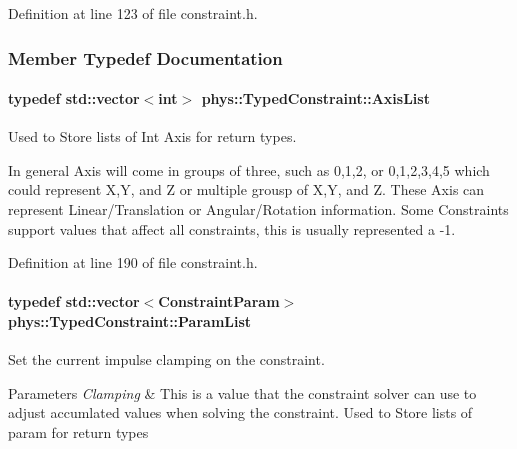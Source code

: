 Definition at line 123 of file constraint.h.



\subsubsection{Member Typedef Documentation}
\hypertarget{classphys_1_1TypedConstraint_a26261a4055e84e104c58d84eea5667c2}{
\paragraph[{AxisList}]{\setlength{\rightskip}{0pt plus 5cm}typedef std::vector$<$int$>$ {\bf phys::TypedConstraint::AxisList}}\hfill}
\label{classphys_1_1TypedConstraint_a26261a4055e84e104c58d84eea5667c2}


Used to Store lists of Int Axis for return types. 

In general Axis will come in groups of three, such as 0,1,2, or 0,1,2,3,4,5 which could represent X,Y, and Z or multiple grousp of X,Y, and Z. These Axis can represent Linear/Translation or Angular/Rotation information. Some Constraints support values that affect all constraints, this is usually represented a -\/1. 

Definition at line 190 of file constraint.h.

\hypertarget{classphys_1_1TypedConstraint_a4c2dcea3fbb764e454840329126d034e}{
\paragraph[{ParamList}]{\setlength{\rightskip}{0pt plus 5cm}typedef std::vector$<${\bf ConstraintParam}$>$ {\bf phys::TypedConstraint::ParamList}}\hfill}
\label{classphys_1_1TypedConstraint_a4c2dcea3fbb764e454840329126d034e}


Set the current impulse clamping on the constraint. 


\begin{DoxyParams}{Parameters}
{\em Clamping} & This is a value that the constraint solver can use to adjust accumlated values when solving the constraint. Used to Store lists of param for return types \\
\hline
\end{DoxyParams}


